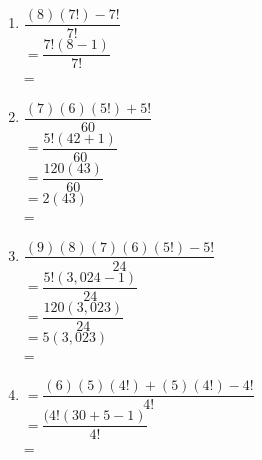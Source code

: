 \begin{multicols}{2}
\begin{enumerate}[label = \arabic*. ]
\item %
$ \dfrac{(8)(7!) -7!}{7!} $ \redcheck \\
$ =\dfrac{7!(8-1)}{7!} $ \redcheck \\
= \redcheck 

\item %
$ \dfrac{(7)(6)(5!) +5!}{60} $ \redcheck \\
$ =\dfrac{5!(42+1)}{60} $ \redcheck \\
$ =\dfrac{120(43)}{60} $ \redcheck \\
$ =2(43) $ \redcheck \\
= \redcheck 

\item %
$ \dfrac{(9)(8)(7)(6)(5!) -5!}{24} $ \redcheck \\
$ =\dfrac{5!(3,024-1)}{24} $ \redcheck \\
$ =\dfrac{120(3,023)}{24} $ \redcheck \\
$ =5(3,023) $ \redcheck \\
= \redcheck 

\item %
$ =\dfrac{(6)(5)(4!) +(5)(4!) -4!}{4!} $ \redcheck \\
$ =\dfrac{(4!(30+5-1)}{4!} $ \redcheck \\
= \redcheck 


%
\end{enumerate}  
 
\end{multicols} 